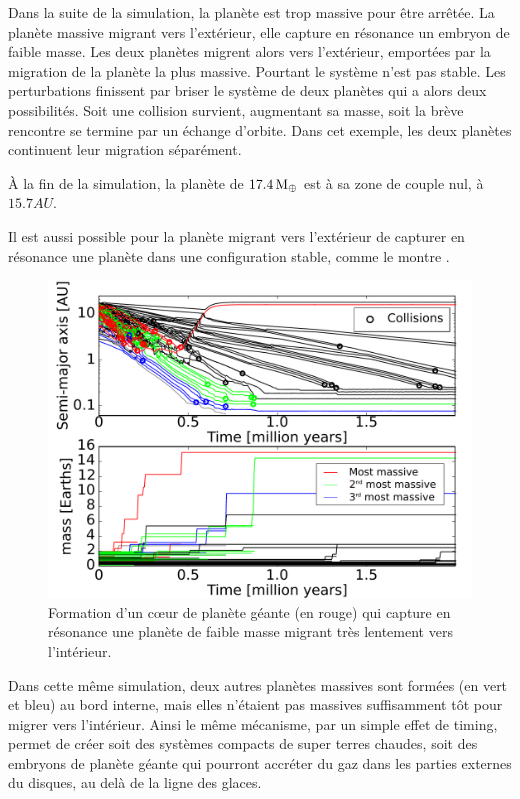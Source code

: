 Dans la suite de la simulation, la planète est trop massive pour être arrêtée. La planète massive migrant vers l'extérieur, elle capture en résonance un embryon de faible masse. Les deux planètes migrent alors vers l'extérieur, emportées par la migration de la planète la plus massive. Pourtant le système n'est pas stable. Les perturbations finissent par briser le système de deux planètes qui a alors deux possibilités. Soit une collision survient, augmentant sa masse, soit la brève rencontre se termine par un échange d'orbite. Dans cet exemple, les deux planètes continuent leur migration séparément.

À la fin de la simulation, la planète de $17.4\mathrm{\thinspace M_\oplus}$ est à sa zone de couple nul, à $15.7\unit{AU}$. 

\bigskip

Il est aussi possible pour la planète migrant vers l'extérieur de capturer en résonance une planète dans une configuration stable, comme le montre .
\begin{figure}[htb]
\centering
\includegraphics[width=0.65\linewidth]{figure/HSE/2-body_outward.pdf}
\caption{Formation d'un cœur de planète géante (en rouge) qui capture en résonance une planète de faible masse migrant très lentement vers l'intérieur.}\label{fig:2-body_outward}%
\end{figure}

Dans cette même simulation, deux autres planètes massives sont formées (en vert et bleu) au bord interne, mais elles n'étaient pas massives suffisamment tôt pour migrer vers l'intérieur. Ainsi le même mécanisme, par un simple effet de timing, permet de créer soit des systèmes compacts de super terres chaudes, soit des embryons de planète géante qui pourront accréter du gaz dans les parties externes du disques, au delà de la ligne des glaces.

\bigskip

